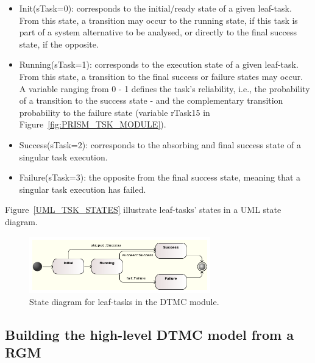 \begin{itemize}

\item Init(sTask=0): corresponds to the initial/ready state of a given leaf-task. From this state, a transition may occur to the running state, if this task is part of a system alternative to be analysed, or directly to the final success state, if the opposite.
\medskip

\item Running(sTask=1): corresponds to the execution state of a given leaf-task. From this state, a transition to the final success or failure states may occur. A variable ranging from 0 - 1 defines the task's reliability, i.e., the probability of a transition to the success state - and the complementary transition probability to the failure state (variable rTask15 in Figure~\ref{fig:PRISM_TSK_MODULE}).
\medskip

\item Success(sTask=2): corresponds to the absorbing and final success state of a singular task execution.
\medskip

\item Failure(sTask=3): the opposite from the final success state, meaning that a singular task execution has failed.

\end{itemize}

Figure~\ref{UML_TSK_STATES} illustrate leaf-tasks' states in a UML state diagram.

\begin{figure}[ht]
\centering
\includegraphics[width=0.7\textwidth]{imgs/UML_TSK_STATES.png}
\caption{State diagram for leaf-tasks in the DTMC module.}
\label{fig:UML_TSK_STATES}
\end{figure}



\subsection{Building the high-level DTMC model from a RGM}

